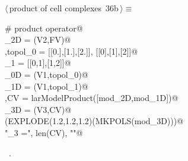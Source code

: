 \documentclass[11pt,oneside]{article}	%
\begin{document}
\begin{flushleft} \small \label{scrap65}
\protect{}$\langle\,$product of cell complexes\nobreak\ {\footnotesize 36b}$\,\rangle\equiv$
\vspace{-1ex}
\begin{list}{}{} \item
\mbox{}\verb@# product operator@\\
\mbox{}\verb@mod_2D = (V2,FV)@\\
\mbox{},topol_0 = [[0.],[1.],[2.]], [[0],[1],[2]]@\\
\mbox{}\verb@topol_1 = [[0,1],[1,2]]@\\
\mbox{}\verb@mod_0D = (V1,topol_0)@\\
\mbox{}\verb@mod_1D = (V1,topol_1)@\\
\mbox{},CV = larModelProduct([mod_2D,mod_1D])@\\
\mbox{}\verb@mod_3D = (V3,CV)@\\
\mbox{}\verb@VIEW(EXPLODE(1.2,1.2,1.2)(MKPOLS(mod_3D)))@\\
\mbox{}\verb@print "\nk_3 =", len(CV), "\n"@\\
\mbox{}\verb@@{\NWsep}
\end{list}
\vspace{-1ex}
\footnotesize\addtolength{\baselineskip}{-1ex}
\begin{list}{}{\setlength{\itemsep}{-\parsep}\setlength{\itemindent}{-\leftmargin}}
\item \NWtxtMacroRefIn\ .
\end{list}
\end{flushleft}
\end{document}
